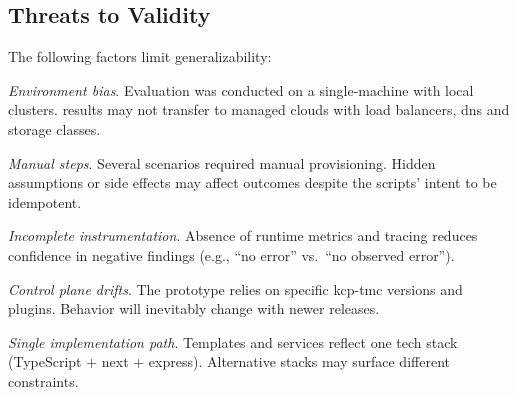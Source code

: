 \documentclass[11pt, a4paper, oneside, listof=totoc]{scrartcl}
\begin{document}
        \subsection{Threats to Validity}\label{subsec:evalThreatsToValidity}
            The following factors limit generalizability:
            \begin{enumerate}[label={[\arabic*]:},
                ref=Challenge~\arabic*,
                leftmargin=*,
                itemsep=0.6\baselineskip]

                \item\label{chal:evalValidityEnvironmentBias}
                    \textit{Environment bias}.
                    Evaluation was conducted on a single-machine with local clusters.
                    results may not transfer to managed clouds with load balancers, \gls{dns} and
                    storage classes.

                \item\label{chal:evalValidityPrototypeBias}
                    \textit{Manual steps}.
                    Several scenarios required manual provisioning.
                    Hidden assumptions or side effects may affect outcomes despite the scripts'
                    intent to be idempotent.

                \item\label{chal:evalValidityIncompleteInstrumentation}
                    \textit{Incomplete instrumentation}.
                    Absence of runtime metrics and tracing reduces confidence in negative findings
                    (e.g., \enquote{no error} vs.\ \enquote{no observed error}).

                \item\label{chal:evalValidityControlPlaneDrifts}
                    \textit{Control plane drifts}.
                    The prototype relies on specific \gls{kcp}-\gls{tmc} versions and plugins.
                    Behavior will inevitably change with newer releases.

                \item\label{chal:evalValiditySingleImplementationPath}
                    \textit{Single implementation path}.
                    Templates and services reflect one tech stack (TypeScript + \gls{next} + \gls{express}).
                    Alternative stacks may surface different constraints.
            \end{enumerate}
\end{document}
